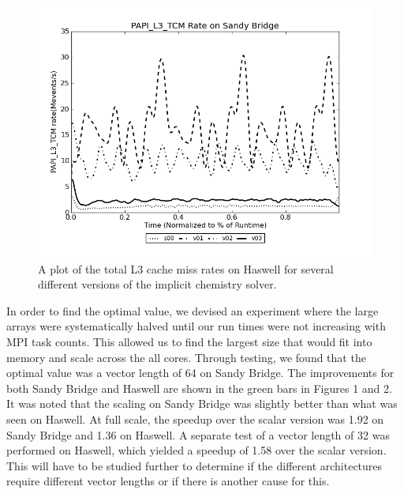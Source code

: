 \begin{figure}[tbp]
 \begin{center}
\includegraphics[width=12.0cm]{figures/PAPI_L3_TCM.png}
\end{center}
\caption{A plot of the total L3 cache miss rates on Haswell for several different versions of the implicit chemistry solver. }
\label{fig:chem-l3-tcm}
\end{figure}


In order to find the optimal value, we devised an experiment where the large arrays were systematically halved until our run times were not increasing with MPI task counts.  This allowed us to find the largest size that would fit into memory and scale across the all cores.  Through testing, we found that the optimal value was a vector length of 64 on Sandy Bridge.  The improvements for both Sandy Bridge and Haswell are shown in the green bars in Figures 1 and 2.  It was noted that the scaling on Sandy Bridge was slightly better than what was seen on Haswell.  At full scale, the speedup over the scalar version was 1.92 on Sandy Bridge and 1.36 on Haswell.  A separate test of a vector length of 32 was performed on Haswell, which yielded a speedup of 1.58 over the scalar version.  This will have to be studied further to determine if the different architectures require different vector lengths or if there is another cause for this.

